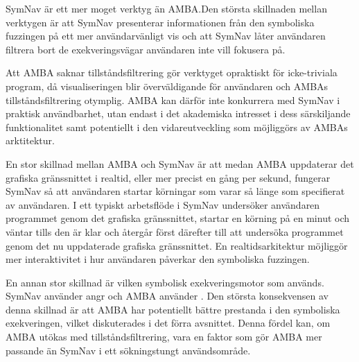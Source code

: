 SymNav är ett mer moget verktyg än AMBA.\@ Den största skillnaden mellan verktygen
är att SymNav presenterar informationen från den symboliska fuzzingen på ett mer
användarvänligt vis och att SymNav låter användaren filtrera bort de
exekveringsvägar användaren inte vill fokusera på.

Att AMBA saknar tillståndsfiltrering gör verktyget opraktiskt för icke-triviala
program, då visualiseringen blir överväldigande för användaren och AMBAs
tillståndsfiltrering otymplig. AMBA kan därför inte konkurrera med SymNav i
praktisk användbarhet, utan endast i det akademiska intresset i dess
särskiljande funktionalitet samt potentiellt i den vidareutveckling som
möjliggörs av AMBAs arktitektur.

En stor skillnad mellan AMBA och SymNav är att medan AMBA uppdaterar det
grafiska gränssnittet i realtid, eller mer precist en gång per sekund, fungerar
SymNav så att användaren startar körningar som varar så länge som specifierat av
användaren. I ett typiskt arbetsflöde i SymNav undersöker användaren programmet
genom det grafiska gränssnittet, startar en körning på en minut och väntar tills
den är klar och återgår först därefter till att undersöka programmet genom det
nu uppdaterade grafiska gränssnittet. En realtidsarkitektur möjliggör mer
interaktivitet i hur användaren påverkar den symboliska fuzzingen.

En annan stor skillnad är vilken symbolisk exekveringsmotor som används. SymNav
använder angr och AMBA använder \stoe{}. Den största konsekvensen av denna
skillnad är att AMBA har potentiellt bättre prestanda i den symboliska
exekveringen, vilket diskuterades i det förra avsnittet. Denna fördel kan, om
AMBA utökas med tillståndsfiltrering, vara en faktor som gör AMBA mer passande
än SymNav i ett sökningstungt användsområde.
